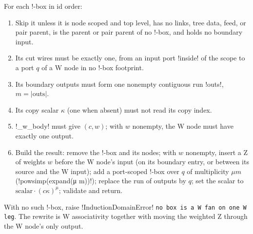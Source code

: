 \begin{algorithm}\label{alg:kernel-w-fused}
For each !-box in id order:
\begin{enumerate}
\item Skip it unless it is node scoped and top level, has no links, tree data, feed, or pair parent, is the parent or pair parent of no !-box, and holds no boundary input.
\item Its cut wires must be exactly one, from an input port \code!inside! of the scope to a port $q$ of a W node in no !-box footprint.
\item Its boundary outputs must form one nonempty contiguous run \code!outs!, $m=|\text{outs}|$.
\item Its copy scalar $\kappa$ (one when absent) must not read its copy index.
\item \py!_w_body! must give $(c,w)$; with $w$ nonempty, the W node must have exactly one output.
\item Build the result: remove the !-box and its nodes; with $w$ nonempty, insert a Z of weights $w$ before the W node's input (on its boundary entry, or between its source and the W input); add a port-scoped !-box over $q$ of multiplicity $\mu m$ (\py!powsimp(expand(μ m))!); replace the run of outputs by $q$; set the scalar to $\text{scalar}\cdot(c\kappa)^{\mu}$; validate and return.
\end{enumerate}
With no such !-box, raise \py!InductionDomainError! \texttt{no box is a W fan on one W leg}. The rewrite is W associativity together with moving the weighted Z through the W node's only output.
\end{algorithm}

